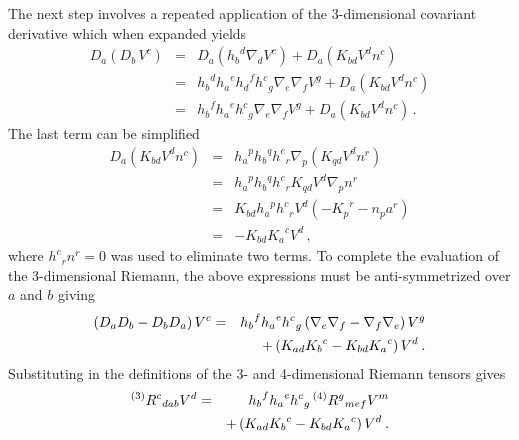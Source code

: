 The next step involves a repeated application of the 3-dimensional covariant
derivative which when expanded yields
\begin{eqnarray*}
  D_a \left( D_b \, V^c \right) & = &   D_a \left({h_b}^d \nabla _d V^c \right)
                                   + D_a \left(K_{bd} V^d n^c \right) \\
                             & = &   {h_b}^d {h_a}^e {h_d}^f {h^c}_g
                                     \nabla _e \nabla _f V^g
                                   + D_a \left(K_{bd} V^d n^c \right) \\
                             & = &   {h_b}^f {h_a}^e {h^c}_g
                                     \nabla _e \nabla _f V^g
                                   + D_a \left(K_{bd} V^d n^c \right) \,.
\end{eqnarray*}
The last term can be simplified
\begin{eqnarray*}
  D_a \left( K_{bd} V^d n^c \right) & = & {h_a}^p {h_b}^q {h^c}_r
                                          \nabla _p
                                          \left( K_{qd} V^d n^r \right) \\
                                    & = & {h_a}^p {h_b}^q {h^c}_r
                                          K_{qd} V^d \nabla _p n^r \\
                                    & = & K_{bd} {h_a}^p {h^c}_r V^d
                                          \left(-{K_p}^r - n_p a^r \right) \\
                                    & = & -K_{bd}{K_a}^c V^d \, ,
\end{eqnarray*}
where ${h^c}_r n^r = 0$ was used to eliminate two terms.
To complete the evaluation of the 3-dimensional Riemann, the above expressions
must be anti-symmetrized over $a$ and $b$ giving
\begin{eqnarray*}
 \left( D_{a}D_{b} - D_{b}D_{a} \right) V^c & = & {h_b}^f {h_a}^e {h^c}_g
                                                 \left(   \nabla _e \nabla _f
                                                        - \nabla _f \nabla _e
                                                 \right)  V^g \\
                                            &    &
                                                 +
                                                 \left(   K_{ad} {K_b}^c
                                                        - K_{bd} {K_a}^c
                                                 \right) V^d \: .
\end{eqnarray*}
Substituting in the definitions of the 3- and 4-dimensional Riemann tensors
gives
\begin{eqnarray*}
 {}^{(3)} {R^c}_{dab} V^d & = & {h_b}^f {h_a}^e {h^c}_g \, {}^{(4)} {R^g}_{mef} V^m \\
                                            &    &
                                                 +
                                                 \left(   K_{ad} {K_b}^c
                                                        - K_{bd} {K_a}^c
                                                 \right) V^d \: .
\end{eqnarray*}


